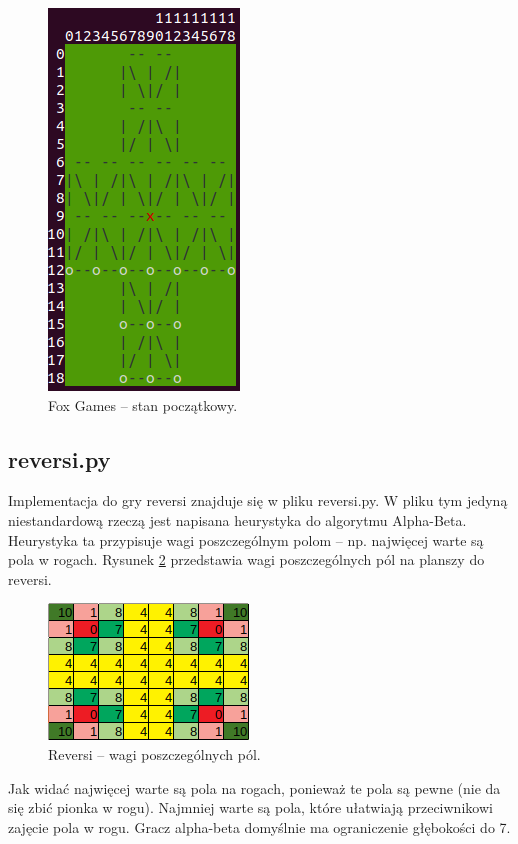 \documentclass[polish,shortabstract,inz]{iithesis}
\begin{document}
\begin{figure}[H]
  \includegraphics[scale=0.5]{./images/foxstartgame.png}
  \centering
  \caption{Fox Games -- stan początkowy.}
  \label{fig:fox_start}
\end{figure}

\subsection{reversi.py}

Implementacja do gry reversi znajduje się w pliku reversi.py.
W pliku tym jedyną niestandardową rzeczą jest napisana heurystyka do algorytmu Alpha-Beta.
Heurystyka ta przypisuje wagi poszczególnym polom -- np. najwięcej warte są pola w rogach.
Rysunek \ref{fig:rev_wag} przedstawia wagi poszczególnych pól na planszy do reversi.
\begin{figure}[H]
  \includegraphics[scale=0.8]{./images/revwag.png}
  \centering
  \caption{Reversi -- wagi poszczególnych pól.}
  \label{fig:rev_wag}
\end{figure}

Jak widać najwięcej warte są pola na rogach, ponieważ te pola są pewne (nie da się zbić pionka w rogu).
Najmniej warte są pola, które ułatwiają przeciwnikowi zajęcie pola w rogu.
Gracz alpha-beta domyślnie ma ograniczenie głębokości do 7.
\end{document}

